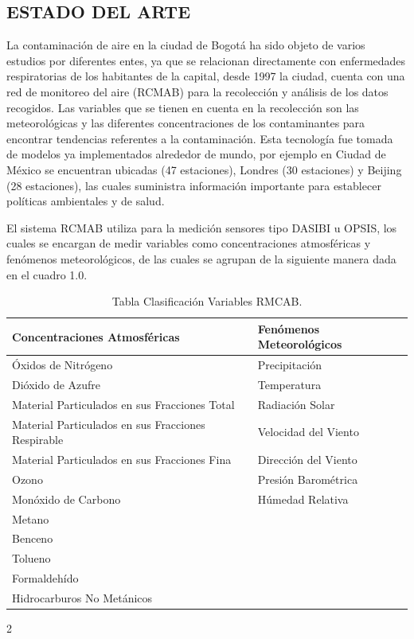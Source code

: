 \documentclass[a4paper, 11pt, oneside]{article}
\theoremstyle{definition}
\theoremstyle{remark}
\begin{document}
\subsection{ESTADO DEL ARTE}
La contaminación de aire en la ciudad de Bogotá ha sido objeto de varios estudios por diferentes entes, ya que se relacionan directamente con enfermedades respiratorias de los habitantes de la capital, desde 1997 la ciudad, cuenta con una red de monitoreo del aire (RCMAB) para la recolección y análisis de los datos recogidos. Las variables que se tienen en cuenta en la recolección son las meteorológicas y las diferentes concentraciones de los contaminantes para encontrar tendencias referentes a la contaminación. Esta tecnología fue tomada de modelos ya implementados alrededor de mundo, por ejemplo en Ciudad de México se encuentran ubicadas (47 estaciones), Londres (30 estaciones) y Beijing (28 estaciones), las cuales suministra información importante para establecer políticas ambientales y de salud.

El sistema RCMAB utiliza para la medición sensores tipo DASIBI u OPSIS, los cuales se encargan de medir variables  como concentraciones atmosféricas y fenómenos meteorológicos, de las cuales se agrupan de la siguiente manera dada en el cuadro 1.0.

\begin{table}[htbp]
\begin{center}
\begin{tabular}{|l|l|}
\hline
Concentraciones Atmosféricas & Fenómenos  Meteorológicos \\
\hline \hline
Óxidos de Nitrógeno & Precipitación \\ \hline
Dióxido de Azufre & Temperatura \\ \hline
Material Particulados en sus Fracciones Total & Radiación Solar \\ \hline
Material Particulados en sus Fracciones Respirable & Velocidad del Viento \\ \hline
Material Particulados en sus Fracciones Fina & Dirección del Viento \\ \hline
Ozono & Presión Barométrica \\ \hline
Monóxido de Carbono & Húmedad Relativa \\ \hline
Metano &  \\ \hline
Benceno &  \\ \hline
Tolueno &  \\ \hline
Formaldehído &  \\ \hline
Hidrocarburos No Metánicos & \\ \hline
\end{tabular}
\caption{Tabla Clasificación Variables RMCAB.}
\label{tabla:sencilla}
\end{center}
\end{table}2
\end{document}
